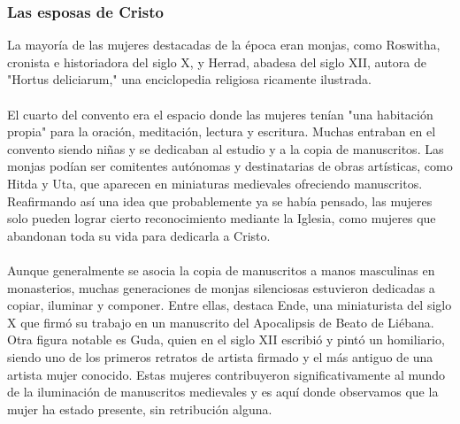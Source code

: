 \documentclass{report}
\begin{document}
\subsubsection{Las esposas de Cristo}
La mayoría de las mujeres destacadas de la época eran monjas, como Roswitha, cronista e historiadora del siglo X, y Herrad, abadesa del siglo XII, autora de "Hortus deliciarum," una enciclopedia religiosa ricamente ilustrada.
\\\\
El cuarto del convento era el espacio donde las mujeres tenían "una habitación propia" para la oración, meditación, lectura y escritura. Muchas entraban en el convento siendo niñas y se dedicaban al estudio y a la copia de manuscritos. Las monjas podían ser comitentes autónomas y destinatarias de obras artísticas, como Hitda y Uta, que aparecen en miniaturas medievales ofreciendo manuscritos. Reafirmando así una idea que probablemente ya se había pensado, las mujeres solo pueden lograr cierto reconocimiento mediante la Iglesia, como mujeres que abandonan toda su vida para dedicarla a Cristo. 
\\\\
Aunque generalmente se asocia la copia de manuscritos a manos masculinas en monasterios, muchas generaciones de monjas silenciosas estuvieron dedicadas a copiar, iluminar y componer. Entre ellas, destaca Ende, una miniaturista del siglo X que firmó su trabajo en un manuscrito del Apocalipsis de Beato de Liébana. Otra figura notable es Guda, quien en el siglo XII escribió y pintó un homiliario, siendo uno de los primeros retratos de artista firmado y el más antiguo de una artista mujer conocido. Estas mujeres contribuyeron significativamente al mundo de la iluminación de manuscritos medievales y es aquí donde observamos que la mujer ha estado presente, sin retribución alguna. 
\end{document}
